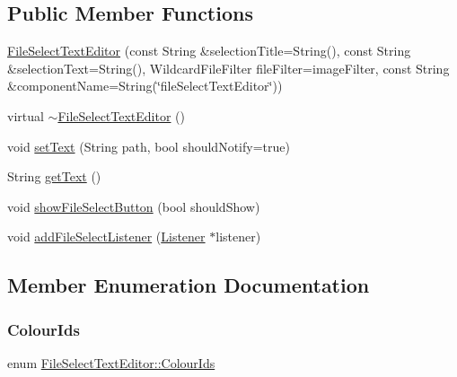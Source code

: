 \subsection*{Public Member Functions}
\begin{DoxyCompactItemize}
\item 
\mbox{\hyperlink{classFileSelectTextEditor_ab45fe4784c4de9c3c43b6755a41e3dc9}{File\+Select\+Text\+Editor}} (const String \&selection\+Title=String(), const String \&selection\+Text=String(), Wildcard\+File\+Filter file\+Filter=image\+Filter, const String \&component\+Name=String(\char`\"{}file\+Select\+Text\+Editor\char`\"{}))
\item 
virtual \mbox{\hyperlink{classFileSelectTextEditor_a6f0e09b8117e264e62e258f7e072b45a}{$\sim$\+File\+Select\+Text\+Editor}} ()
\item 
void \mbox{\hyperlink{classFileSelectTextEditor_a902fd5a435b471bb2f0360e4d764d9c4}{set\+Text}} (String path, bool should\+Notify=true)
\item 
String \mbox{\hyperlink{classFileSelectTextEditor_a759f2ef70d2aa46c5e7a53bd6574067a}{get\+Text}} ()
\item 
void \mbox{\hyperlink{classFileSelectTextEditor_a3a6690785fb56763277bd4fbfd4993d0}{show\+File\+Select\+Button}} (bool should\+Show)
\item 
void \mbox{\hyperlink{classFileSelectTextEditor_ad0a2990300e826ec0741f0f060e55951}{add\+File\+Select\+Listener}} (\mbox{\hyperlink{classFileSelectTextEditor_1_1Listener}{Listener}} $\ast$listener)
\end{DoxyCompactItemize}


\subsection{Member Enumeration Documentation}
\mbox{\label{classFileSelectTextEditor_abb676904fcaffc31edde4137c91a78df}} 
\subsubsection{\texorpdfstring{Colour\+Ids}{ColourIds}}
{\footnotesize\ttfamily enum \mbox{\hyperlink{classFileSelectTextEditor_abb676904fcaffc31edde4137c91a78df}{File\+Select\+Text\+Editor\+::\+Colour\+Ids}}}

